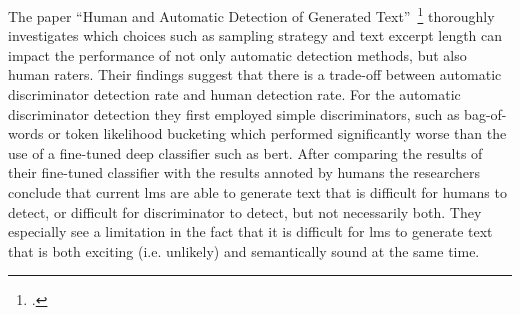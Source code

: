 The paper ``Human and Automatic Detection of Generated Text''~\footcite{ippolito2019human} thoroughly investigates which choices such as sampling strategy and text excerpt length can impact the performance of not only automatic detection methods, but also human raters. Their findings suggest that there is a trade-off between automatic discriminator detection rate and human detection rate. For the automatic discriminator detection they first employed simple discriminators, such as bag-of-words or token likelihood bucketing which performed significantly worse than the use of a fine-tuned deep classifier such as \gls{bert}. After comparing the results of their fine-tuned classifier with the results annoted by humans the researchers conclude that current \gls{lm}s are able to generate text that is difficult for humans to detect, or difficult for discriminator to detect, but not necessarily both. They especially see a limitation in the fact that it is difficult for \gls{lm}s to generate text that is both exciting (i.e. unlikely) and semantically sound at the same time.
